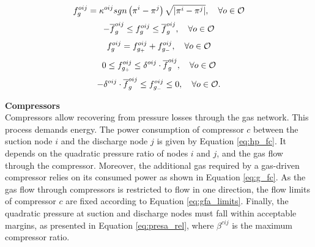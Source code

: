 \begin{equation}
{f}^{oij}_{g} = {{\kappa}^{oij}} sgn \left(\pi^{i}-\pi^{j}\right) {\sqrt{\left|\pi^{i}-\pi^{j}\right|}}, \quad \forall o \in {\cal{O}}
\label{eq:wey}
\end{equation}
\begin{equation}
 - \overline{f}^{oij}_{g}  \le f^{oij}_{g} \le  \overline{f}^{oij}_{g},  \quad \forall o \in {\cal{O}}
\label{fgo_limits}
\end{equation}
\begin{equation}
{f}^{oij}_{g} =  f^{oij}_{g_+} + {f}^{oij}_{g_-}, \quad \forall o \in {\cal{O}}
\label{eq:fgo}
\end{equation}
\begin{equation}
0 \le f^{oij}_{g_+} \le \delta^{oij} \cdot \overline{f}^{oij}_{g}, \quad \forall o \in {\cal{O}}
\label{eq:fgopos_limits}
\end{equation}
\begin{equation}
- \delta^{oij} \cdot \overline{f}^{oij}_{g} \le f^{oij}_{g_-} \le 0, \quad \forall o \in {\cal{O}}.
\label{eq:fgoneg_limits}
\end{equation}

\noindent \textbf{Compressors}\\

Compressors allow recovering from pressure losses through the gas network. This process demands energy. The power consumption of compressor $c$ between the suction node $i$ and the discharge node $j$ is given by Equation \ref{eq:hp_fc}. It depends on the quadratic pressure ratio of nodes $i$ and $j$, and the gas flow through the compressor. Moreover, the additional gas required by a gas-driven compressor relies on its consumed power as shown in Equation \ref{eq:g_fc}. As the gas flow through compressors is restricted to flow in one direction, the flow limits of compressor $c$ are fixed according to Equation \ref{eq:gfa_limits}. Finally, the quadratic pressure at suction and discharge nodes must fall within acceptable margins, as presented in Equation \ref{eq:presa_rel}, where $\beta^{cij}$ is the maximum compressor ratio.\\

